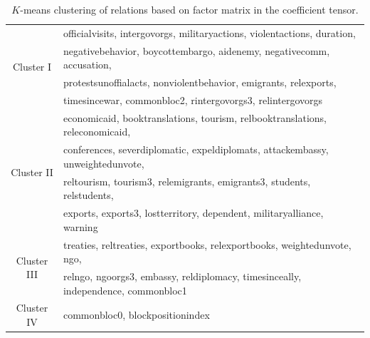 \documentclass[11pt]{article}
\theoremstyle{plain}
\theoremstyle{definition}
\begin{document}
\begin{table}[ht]
\begin{tabular}{c|l}
\hline
\multirow{4}{*}{Cluster I}  &officialvisits, intergovorgs,  militaryactions, violentactions, duration, \\
&negativebehavior, boycottembargo, aidenemy, negativecomm, accusation, \\
& protestsunoffialacts,    nonviolentbehavior, emigrants, relexports,   \\
& timesincewar, commonbloc2, rintergovorgs3, relintergovorgs\\
\hline
\multirow{4}{*}{Cluster II}& economicaid, booktranslations, tourism, relbooktranslations, releconomicaid, \\
& conferences, severdiplomatic, expeldiplomats, attackembassy, unweightedunvote,\\
& reltourism, tourism3, relemigrants, emigrants3, students, relstudents, \\
&exports, exports3, lostterritory, dependent, militaryalliance, warning  \\
\hline
\multirow{2}{*}{Cluster III} & treaties, reltreaties, exportbooks, relexportbooks, weightedunvote, ngo, \\
&relngo, ngoorgs3, embassy, reldiplomacy, timesinceally, independence, commonbloc1\\
\hline
Cluster IV & commonbloc0, blockpositionindex\\
\hline
\end{tabular}
\caption{$K$-means clustering of relations based on factor matrix in the coefficient tensor.}\label{tab:s1}
\end{table}




\end{document}

